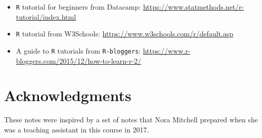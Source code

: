 \documentclass[12pt]{article}
\begin{document}
\begin{itemize}

  \item {\tt R} tutorial for beginners from Datacamp:
    \url{https://www.statmethods.net/r-tutorial/index.html}

  \item {\tt R} tutorial from W3Schools:
    \url{https://www.w3schools.com/r/default.asp}

  \item A guide to {\tt R} tutorials from {\tt R-bloggers}:
    \url{https://www.r-bloggers.com/2015/12/how-to-learn-r-2/} 

\end{itemize}

\section{Acknowledgments}

These notes were inspired by a set of notes that Nora Mitchell
prepared when she was a teaching assistant in this course in 2017.

\ccLicense
\end{document}

